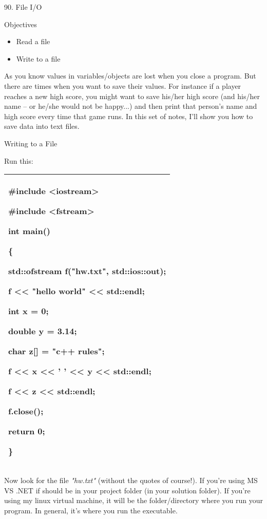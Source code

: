 \documentclass[
]{article}
\author{}
\date{}
\providecommand{\tightlist}{%
  \setlength{\itemsep}{0pt}\setlength{\parskip}{0pt}}
\begin{document}
90. File I/O

Objectives

\begin{itemize}
\tightlist
\item
  Read a file
\item
  Write to a file
\end{itemize}

As you know values in variables/objects are lost when you close a
program. But there are times when you want to save their values. For
instance if a player reaches a new high score, you might want to save
his/her high score (and his/her name -- or he/she would not be happy...)
and then print that person's name and high score every time that game
runs. In this set of notes, I'll show you how to save data into text
files.

Writing to a File

Run this:

\begin{longtable}[]{@{}l@{}}
\toprule
\endhead
\begin{minipage}[t]{0.97\columnwidth}\raggedright
\#include \textless iostream\textgreater{}

\#include \textless fstream\textgreater{}

int main()

\{

std::ofstream f("hw.txt", std::ios::out);

f \textless\textless{} "hello world" \textless\textless{} std::endl;

int x = 0;

double y = 3.14;

char z{[}{]} = "c++ rules";

f \textless\textless{} x \textless\textless{} ' ' \textless\textless{} y
\textless\textless{} std::endl;

f \textless\textless{} z \textless\textless{} std::endl;

f.close();

return 0;

\}\strut
\end{minipage}\tabularnewline
\bottomrule
\end{longtable}

Now look for the file \emph{"hw.txt"} (without the quotes of course!).
If you're using MS VS .NET if should be in your project folder (in your
solution folder). If you're using my linux virtual machine, it will be
the folder/directory where you run your program. In general, it's where
you run the executable.
\end{document}
